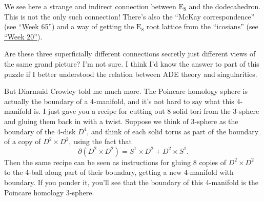 \documentclass{article}
\begin{document}
We see here a strange and indirect connection between \(\mathrm{E}_8\)
and the dodecahedron. This is not the only such connection! There's also
the ``McKay correspondence'' (see \protect\hyperlink{week65}{``Week
65''}) and a way of getting the \(\mathrm{E}_8\) root lattice from the
``icosians'' (see \protect\hyperlink{week20}{``Week 20''}).

Are these three superficially different connections secretly just
different views of the same grand picture? I'm not sure. I think I'd
know the answer to part of this puzzle if I better understood the
relation between ADE theory and singularities.

But Diarmuid Crowley told me much more. The Poincare homology sphere is
actually the boundary of a 4-manifold, and it's not hard to say what
this 4-manifold is. I just gave you a recipe for cutting out 8 solid
tori from the 3-sphere and gluing them back in with a twist. Suppose we
think of 3-sphere as the boundary of the 4-disk \(D^4\), and think of
each solid torus as part of the boundary of a copy of
\(D^2 \times D^2\), using the fact that
\[\partial(D^2\times D^2) = S^1\times D^2 + D^2\times S^1.\] Then the
same recipe can be seen as instructions for gluing 8 copies of
\(D^2\times D^2\) to the 4-ball along part of their boundary, getting a
new 4-manifold with boundary. If you ponder it, you'll see that the
boundary of this 4-manifold is the Poincare homology 3-sphere.
\end{document}
